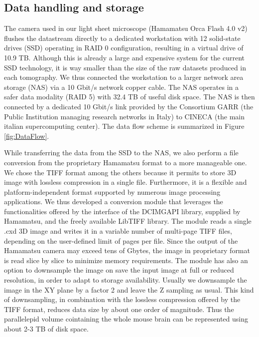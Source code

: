 \documentclass[12pt]{spieman}  %
\begin{document}
\subsection{Data handling and storage}

The camera used in our light sheet microscope (Hamamatsu Orca Flash 4.0 v2) flushes the datastream directly to a dedicated workstation with 12 solid-state drives (SSD) operating in RAID 0 configuration, resulting in a virtual drive of 10.9 TB. Although this is already a large and expensive system for the current SSD technology, it is way smaller than the size of the raw datasets produced in each tomography. We thus connected the workstation to a larger network area storage (NAS) via a 10 Gbit/s network copper cable. The NAS operates in a safer data modality (RAID 5) with 32.4 TB of useful disk space. The NAS is then connected by a dedicated 10 Gbit/s link provided by the Consortium GARR (the Public Institution managing research networks in Italy) to CINECA (the main italian supercomputing center). The data flow scheme is summarized in Figure \ref{fig:DataFlow}.

While transferring the data from the SSD to the NAS, we also perform a file conversion from the proprietary Hamamatsu format to a more manageable one. We chose the TIFF format among the others because it permits to store 3D image with lossless compression in a single file. Furthermore, it is a flexible and platform-independent format supported by numerous image processing applications. We thus developed a conversion module that leverages the functionalities offered by the interface of the DCIMGAPI library, supplied by Hamamatsu, and the freely available LibTIFF library. The module reads a single .cxd 3D image and writes it in a variable number of multi-page TIFF files, depending on the user-defined limit of pages per file. Since the output of the Hamamatsu camera may exceed tens of Gbytes, the image in proprietary format is read slice by slice to minimize memory requirements. The module has also an option to downsample the image on save the input image at full or reduced resolution, in order to adapt to storage availability. Usually we downsample the image in the XY plane by a factor 2 and leave the Z sampling as usual. This kind of downsampling, in combination with the lossless compression offered by the TIFF format, reduces data size by about one order of magnitude. Thus the parallelepid volume cointaining the whole mouse brain can be represented using about 2-3 TB of disk space.
\end{document}
